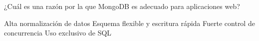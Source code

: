 \question[1] ¿Cuál es una razón por la que MongoDB es adecuado para aplicaciones web?
\begin{choices}
\choice Alta normalización de datos
\CorrectChoice Esquema flexible y escritura rápida
\choice Fuerte control de concurrencia
\choice Uso exclusivo de SQL
\end{choices}